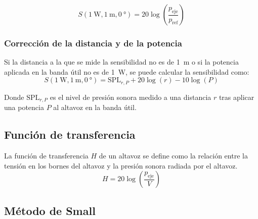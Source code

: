 \documentclass[a4paper, 8pt]{extarticle}
\begin{document}
\begin{multicols}{3}
    \[ S \left( \qty{1}{\watt }, \qty{1}{\meter }, \qty{0}{\degree } \right) = 20 \log \left( \frac{p _{\text{eje}}}{p _{\text{ref}}} \right)  \]

    \subsubsection{Corrección de la distancia y de la potencia}
    Si la distancia a la que se mide la sensibilidad no es de \qty{1}{\meter} o si la potencia aplicada en la banda útil no es de \qty{1}{\watt}, se puede calcular la sensibilidad como:
    \[
        S \left( \qty{1}{\watt }, \qty{1}{\meter}, \qty{0}{\degree }  \right) = \text{SPL}_{r,P} + 20 \log \left( r \right) - 10 \log \left( P \right)
    \]

    \color{gray}Donde $\text{SPL}_{r,P}$ es el nivel de presión sonora medido a una distancia $r$ tras aplicar una potencia $P$ al altavoz en la banda útil.\color{black}

    \subsection{Función de transferencia}

    La función de transferencia $H$ de un altavoz se define como la relación entre la tensión en los bornes del altavoz y la presión sonora radiada por el altavoz.
    \[ H = 20 \log \left( \frac{p_{\text{eje}}}{V} \right)  \]

    \subsection{Método de Small}


\end{multicols}
\end{document}
